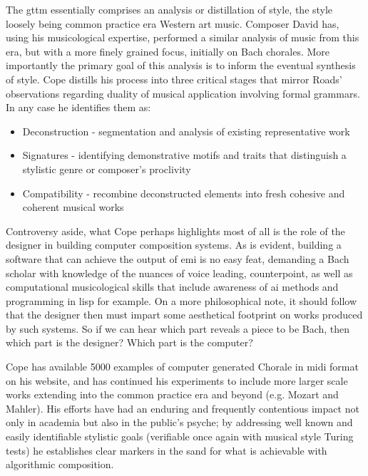 The \acrshort{gttm} essentially comprises an analysis or distillation of style, the style loosely being common practice era Western art music. Composer David \cite{Cope1991} has, using his musicological expertise, performed a similar analysis of music from this era, but with a more finely grained focus, initially on Bach chorales. More importantly the primary goal of this analysis is to inform the eventual synthesis of style. Cope distills his process into three critical stages that mirror Roads’ observations regarding duality of musical application involving formal grammars. In any case he identifies them as:

\begin{itemize}
	\item Deconstruction - segmentation and analysis of existing representative work
	\item Signatures - identifying demonstrative motifs and traits that distinguish a stylistic genre or composer’s proclivity
	\item Compatibility - recombine deconstructed elements into fresh cohesive and coherent musical works
\end{itemize}

Controversy aside, what Cope perhaps highlights most of all is the role of the designer in building computer composition systems. As is evident, building a software that can achieve the output of \acrshort{emi} is no easy feat, demanding a Bach scholar with knowledge of the nuances of voice leading, counterpoint, as well as computational musicological skills that include awareness of \acrshort{ai} methods and programming in \acrshort{lisp} for example. On a more philosophical note, it should follow that the designer then must impart some aesthetical footprint on works produced by such systems. So if we can hear which part reveals a piece to be Bach, then which part is the designer? Which part is the computer? 

Cope has available 5000 examples of computer generated Chorale in \acrshort{midi} format on his website, and has continued his experiments to include more larger scale works extending into the common practice era and beyond (e.g. Mozart and Mahler). His efforts have had an enduring and frequently contentious impact not only in academia \citep{Wiggins2008} but also in the public’s psyche; by addressing well known and easily identifiable stylistic goals (verifiable once again with musical style Turing tests)   he establishes clear markers in the sand for what is achievable with algorithmic composition. 

